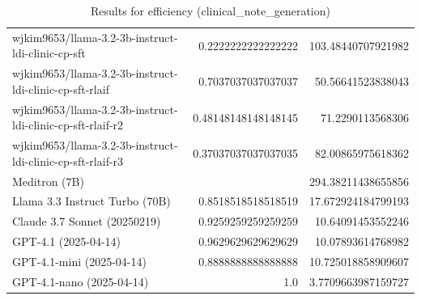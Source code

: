 \begin{table}[htp]
{\begin{tabular}{lrr}
wjkim9653/llama-3.2-3b-instruct-ldi-clinic-cp-sft & 0.2222222222222222 & 103.48440707921982 \\
wjkim9653/llama-3.2-3b-instruct-ldi-clinic-cp-sft-rlaif & 0.7037037037037037 & 50.56641523838043 \\
wjkim9653/llama-3.2-3b-instruct-ldi-clinic-cp-sft-rlaif-r2 & 0.48148148148148145 & 71.2290113568306 \\
wjkim9653/llama-3.2-3b-instruct-ldi-clinic-cp-sft-rlaif-r3 & 0.37037037037037035 & 82.00865975618362 \\
Meditron (7B) &  & 294.38211438655856 \\
Llama 3.3 Instruct Turbo (70B) & 0.8518518518518519 & 17.672924184799193 \\
Claude 3.7 Sonnet (20250219) & 0.9259259259259259 & 10.64091453552246 \\
GPT-4.1 (2025-04-14) & 0.9629629629629629 & 10.07893614768982 \\
GPT-4.1-mini (2025-04-14) & 0.8888888888888888 & 10.725018858909607 \\
GPT-4.1-nano (2025-04-14) & 1.0 & 3.7709663987159727 \\
\bottomrule
\end{tabular}}
\caption{Results for efficiency (clinical_note_generation)}
\label{fig:efficiency (clinical_note_generation)}
\end{table}